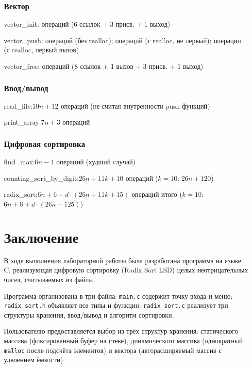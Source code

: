 \documentclass[a4paper,14pt]{extarticle}
\newcommand{\opcount}[2]{%
  \par\vspace{2pt}%
  \noindent
  \colorbox{gray!15}{%
    \parbox{\dimexpr\linewidth-2\fboxsep\relax}{%
      \small\bfseries\ttfamily\raggedright #1:\enskip #2%
    }%
  }%
  \par\vspace{6pt}%
}
\begin{document}
\subsubsection*{Вектор}


\opcount{vector\_init}{10 операций (6 ссылок + 3 присв. + 1 выход)}
\opcount{vector\_push}{16 операций (без realloc); операций (с realloc, не первый);\enspace 32 операции (с realloc, первый вызов)}
\opcount{vector\_free}{13 операций (8 ссылок + 1 вызов + 3 присв. + 1 выход)}

\subsubsection*{Ввод/вывод}


\opcount{read\_file}{$10n + 12$ операций (не считая внутренности push-функций)}
\opcount{print\_array}{$7n + 3$ операций}

\subsubsection*{Цифровая сортировка}


\opcount{find\_max}{$6n - 1$ операций (худший случай)}
\opcount{counting\_sort\_by\_digit}{$26n + 11k + 10$ операций ($k{=}10$: $26n + 120$)}
\opcount{radix\_sort}{$6n + 6 + d\cdot(26n + 11k + 15)$ операций итого ($k{=}10$: $6n + 6 + d\cdot(26n+125)$)}

\newpage
\section*{Заключение}

В ходе выполнения лабораторной работы была разработана программа на языке C, реализующая цифровую сортировку (Radix Sort LSD) целых неотрицательных чисел, считываемых из файла.

Программа организована в три файла: \texttt{main.c} содержит точку входа и меню; \texttt{radix\_sort.h} объявляет все типы и функции; \texttt{radix\_sort.c} реализует три структуры хранения, ввод/вывод и алгоритм сортировки.

Пользователю предоставляется выбор из трёх структур хранения: статического массива (фиксированный буфер на стеке), динамического массива (однократный \texttt{malloc} после подсчёта элементов) и вектора (авторасширяемый массив с удвоением ёмкости).
\end{document}
